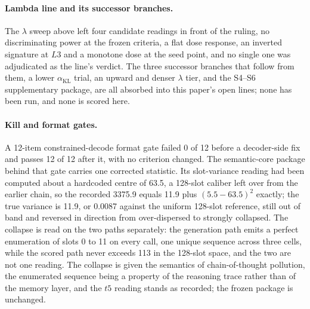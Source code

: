 \documentclass[11pt,a4paper]{article}
\begin{document}
\paragraph{Lambda line and its successor branches.}
The $\lambda$ sweep above left four candidate readings in front of the ruling, no discriminating power at the frozen criteria, a flat dose response, an inverted signature at $L3$ and a monotone dose at the seed point, and no single one was adjudicated as the line's verdict. The three successor branches that follow from them, a lower $\alpha_{\mathrm{KL}}$ trial, an upward and denser $\lambda$ tier, and the S4--S6 supplementary package, are all absorbed into this paper's open lines; none has been run, and none is scored here.

\paragraph{Kill and format gates.}
A 12-item constrained-decode format gate failed 0 of 12 before a decoder-side fix and passes 12 of 12 after it, with no criterion changed. The semantic-core package behind that gate carries one corrected statistic. Its slot-variance reading had been computed about a hardcoded centre of 63.5, a 128-slot caliber left over from the earlier chain, so the recorded 3375.9 equals 11.9 plus $(5.5-63.5)^2$ exactly; the true variance is 11.9, or 0.0087 against the uniform 128-slot reference, still out of band and reversed in direction from over-dispersed to strongly collapsed. The collapse is read on the two paths separately: the generation path emits a perfect enumeration of slots 0 to 11 on every call, one unique sequence across three cells, while the scored path never exceeds 113 in the 128-slot space, and the two are not one reading. The collapse is given the semantics of chain-of-thought pollution, the enumerated sequence being a property of the reasoning trace rather than of the memory layer, and the $t5$ reading stands as recorded; the frozen package is unchanged.
\end{document}
